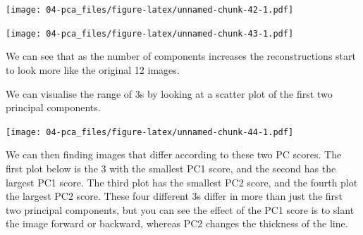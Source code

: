 \documentclass[]{book}
\newenvironment{Shaded}{\begin{snugshade}}{\end{snugshade}}
\newcommand{\CommentTok}[1]{\textcolor[rgb]{0.56,0.35,0.01}{\textit{#1}}}
\newcommand{\DataTypeTok}[1]{\textcolor[rgb]{0.13,0.29,0.53}{#1}}
\newcommand{\DecValTok}[1]{\textcolor[rgb]{0.00,0.00,0.81}{#1}}
\newcommand{\KeywordTok}[1]{\textcolor[rgb]{0.13,0.29,0.53}{\textbf{#1}}}
\newcommand{\NormalTok}[1]{#1}
\newcommand{\OperatorTok}[1]{\textcolor[rgb]{0.81,0.36,0.00}{\textbf{#1}}}
\newcommand{\StringTok}[1]{\textcolor[rgb]{0.31,0.60,0.02}{#1}}
\theoremstyle{definition}
\theoremstyle{definition}
\theoremstyle{definition}
\theoremstyle{remark}
\begin{document}
\texttt{[image: 04-pca\_files/figure-latex/unnamed-chunk-42-1.pdf]}

\begin{Shaded}
\end{Shaded}

\texttt{[image: 04-pca\_files/figure-latex/unnamed-chunk-43-1.pdf]}

We can see that as the number of components increases the reconstructions start to look more like the original 12 images.

We can visualise the range of 3s by looking at a scatter plot of the first two principal components.

\begin{Shaded}
\end{Shaded}

\texttt{[image: 04-pca\_files/figure-latex/unnamed-chunk-44-1.pdf]}

We can then finding images that differ according to these two PC scores. The first plot below is the 3 with the smallest PC1 score, and the second has the largest PC1 score. The third plot has the smallest PC2 score, and the fourth plot the largest PC2 score.
These four different 3s differ in more than just the first two principal components, but you can see the effect of the PC1 score is to slant the image forward or backward, whereas PC2 changes the thickness of the line.

\begin{Shaded}
\end{Shaded}
\end{document}
